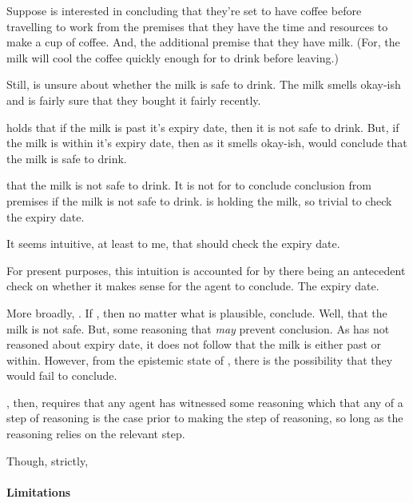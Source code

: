 \begin{note}[\prequ{3}]
  \begin{illustration}
    Suppose  is interested in concluding that they're set to have coffee before travelling to work from the premises that they have the time and resources to make a cup of coffee.
    And, the additional premise that they have milk.
    (For, the milk will cool the coffee quickly enough for  to drink before leaving.)

    Still,  is unsure about whether the milk is safe to drink.
    The milk smells okay-ish and  is fairly sure that they bought it fairly recently.

     holds that if the milk is past it's expiry date, then it is not safe to drink.
    But, if the milk is within it's expiry date, then as it smells okay-ish,  would conclude that the milk is safe to drink.
  \end{illustration}
  \epVAd{} that the milk is not safe to drink.
  It is not \epVAd{} for  to conclude conclusion from premises if the milk is not safe to drink.
   is holding the milk, so trivial to check the expiry date.

  It seems intuitive, at least to me, that  should check the expiry date.

  For present purposes, this intuition is accounted for by there being an antecedent check on whether it makes sense for the agent to conclude.
  The expiry date.

  More broadly, \support{}.
  If \support{}, then no matter what is plausible, conclude.
  Well, that the milk is not safe.
  But, some reasoning that \emph{may} prevent conclusion.
  As  has not reasoned about expiry date, it does not follow that the milk is either past or within.
  However, from the epistemic state of , there is the possibility that they would fail to conclude.
\end{note}

\begin{note}
  \ideaCS{}, then, requires that any agent has witnessed some reasoning which  that any \requ{} of a step of reasoning is the case prior to making the step of reasoning, so long as the reasoning relies on the relevant step.

  Though, strictly, \ideaCS{}
\end{note}

\paragraph{Limitations}

